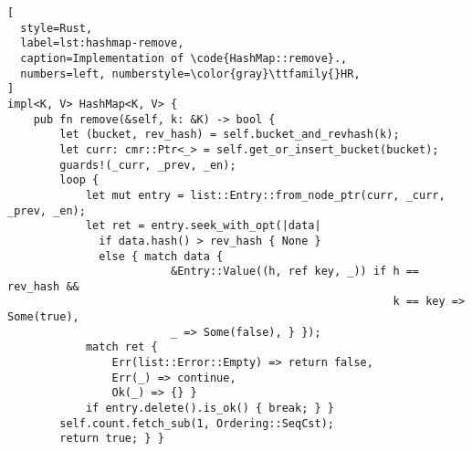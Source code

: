 \begin{lstlisting}[
  style=Rust,
  label=lst:hashmap-remove,
  caption=Implementation of \code{HashMap::remove}.,
  numbers=left, numberstyle=\color{gray}\ttfamily{}HR,
]
impl<K, V> HashMap<K, V> {
    pub fn remove(&self, k: &K) -> bool {
        let (bucket, rev_hash) = self.bucket_and_revhash(k);
        let curr: cmr::Ptr<_> = self.get_or_insert_bucket(bucket);
        guards!(_curr, _prev, _en);
        loop {
            let mut entry = list::Entry::from_node_ptr(curr, _curr, _prev, _en);
            let ret = entry.seek_with_opt(|data| 
              if data.hash() > rev_hash { None } 
              else { match data {
                         &Entry::Value((h, ref key, _)) if h == rev_hash &&
                                                           k == key => Some(true),
                         _ => Some(false), } });
            match ret {
                Err(list::Error::Empty) => return false,
                Err(_) => continue,
                Ok(_) => {} }
            if entry.delete().is_ok() { break; } }
        self.count.fetch_sub(1, Ordering::SeqCst);
        return true; } }
\end{lstlisting}
